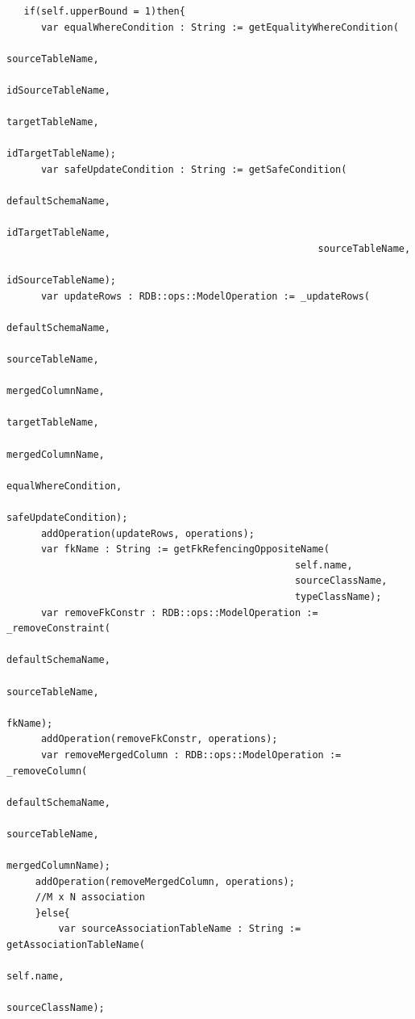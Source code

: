 \documentclass[11pt,twoside,a4paper]{book}
\begin{document}
\begin{verbatim}
   if(self.upperBound = 1)then{
      var equalWhereCondition : String := getEqualityWhereCondition(
                                                         sourceTableName,
                                                         idSourceTableName,
                                                         targetTableName,
                                                         idTargetTableName);
      var safeUpdateCondition : String := getSafeCondition(
                                                      defaultSchemaName,
                                                      idTargetTableName,
                                                      sourceTableName,
                                                      idSourceTableName);
      var updateRows : RDB::ops::ModelOperation := _updateRows(
                                                            defaultSchemaName,
                                                            sourceTableName,
                                                            mergedColumnName,
                                                            targetTableName,
                                                            mergedColumnName,
                                                            equalWhereCondition,
                                                            safeUpdateCondition);
	  addOperation(updateRows, operations);
      var fkName : String := getFkRefencingOppositeName(
                                                  self.name,
                                                  sourceClassName,
                                                  typeClassName);
      var removeFkConstr : RDB::ops::ModelOperation := _removeConstraint(
                                                                  defaultSchemaName,
                                                                  sourceTableName,
                                                                  fkName);
      addOperation(removeFkConstr, operations);
      var removeMergedColumn : RDB::ops::ModelOperation := _removeColumn(
                                                                  defaultSchemaName,
                                                                  sourceTableName,
                                                                  mergedColumnName);
     addOperation(removeMergedColumn, operations);
     //M x N association	
     }else{
         var sourceAssociationTableName : String := getAssociationTableName(
                                                                   self.name,
                                                                   sourceClassName);

\end{verbatim}
\end{document}

